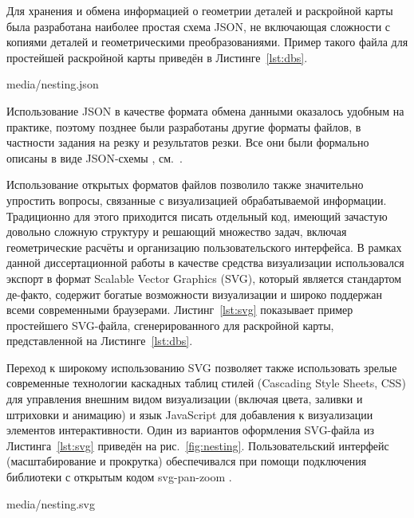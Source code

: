 Для хранения и обмена информацией о геометрии деталей
и раскройной карты
была разработана наиболее простая схема JSON,
не включающая сложности с копиями деталей и геометрическими
преобразованиями.
Пример такого файла для простейшей раскройной карты
приведён в Листинге~\ref{lst:dbs}.


    {media/nesting.json}

Использование JSON
в качестве формата обмена данными
оказалось удобным на практике,
поэтому позднее были разработаны другие
форматы файлов, в частности
задания на резку и результатов резки.
Все они были формально описаны в
виде JSON-схемы
\autocite*[]{bi:json-schema},
см.~\cite{bi:dbs-schema}.

Использование открытых форматов файлов позволило
также значительно упростить вопросы,
связанные с визуализацией обрабатываемой информации.
Традиционно для этого приходится
писать отдельный код,
имеющий зачастую довольно сложную структуру и решающий
множество задач, включая геометрические расчёты
и организацию пользовательского интерфейса.
В рамках данной диссертационной работы
в качестве средства визуализации
использовался экспорт в формат
Scalable Vector Graphics
(SVG),
который является стандартом де-факто,
содержит богатые возможности визуализации
и широко поддержан всеми современными браузерами.
Листинг~\ref{lst:svg}
показывает пример простейшего SVG-файла,
сгенерированного для раскройной карты,
представленной на Листинге~\ref{lst:dbs}.

Переход к широкому использованию SVG
позволяет также использовать зрелые современные технологии
каскадных таблиц стилей
(Cascading Style Sheets, CSS)
для управления внешним видом визуализации
(включая цвета, заливки и штриховки и анимацию)
и язык JavaScript
для добавления к визуализации
элементов интерактивности.
Один из вариантов оформления
SVG-файла из Листинга~\ref{lst:svg}
приведён на рис.~\ref{fig:nesting}.
Пользовательский интерфейс
(масштабирование и прокрутка)
обеспечивался при помощи подключения
библиотеки с открытым кодом
svg-pan-zoom
\autocite*{bi:svg-pan-zoom}.


  {media/nesting.svg}

